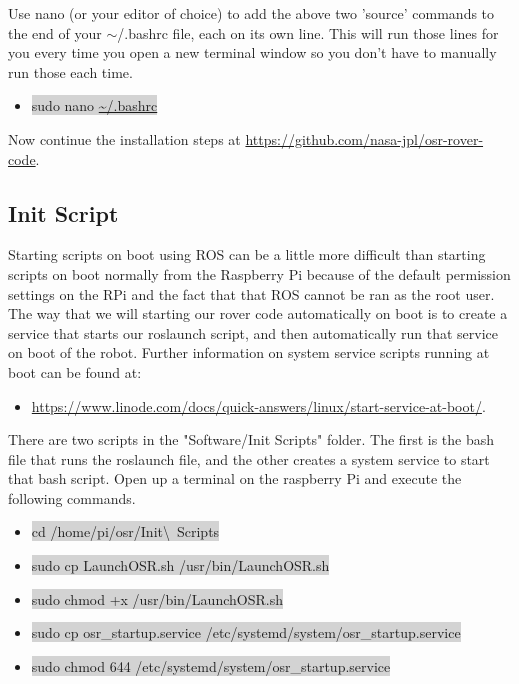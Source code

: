\documentclass{article}
\begin{document}
\noindent Use nano (or your editor of choice) to add the above two 'source' commands to the end of your $\sim$/.bashrc file, each on its own line. This will run those lines for you every time you open a new terminal window so you don't have to manually run those each time.
\begin{itemize}
	\item[] \colorbox{lightgray}{sudo nano \url{~/.bashrc}}
\end{itemize}

Now continue the installation steps at \href{https://github.com/nasa-jpl/osr-rover-code}{https://github.com/nasa-jpl/osr-rover-code}.

\bigskip

\subsection{Init Script}

Starting scripts on boot using ROS can be a little more difficult than starting scripts on boot normally from the Raspberry Pi because of the default permission settings on the RPi and the fact that that ROS cannot be ran as the root user. The way that we will starting our rover code automatically on boot is to create a service that starts our roslaunch script, and then automatically run that service on boot of the robot. Further information on system service scripts running at boot can be found at: 

\begin{itemize}
	\item \href{https://www.linode.com/docs/quick-answers/linux/start-service-at-boot/}{https://www.linode.com/docs/quick-answers/linux/start-service-at-boot/}. 
\end{itemize}

There are two scripts in the "Software/Init Scripts" folder. The first is the bash file that runs the roslaunch file, and the other creates a system service to start that bash script. Open up a terminal on the raspberry Pi and execute the following commands.

\begin{itemize}
	\item[] \colorbox{lightgray}{cd /home/pi/osr/Init\textbackslash\ Scripts}
	\item[] \colorbox{lightgray}{sudo cp LaunchOSR.sh /usr/bin/LaunchOSR.sh}
	\item[] \colorbox{lightgray}{sudo chmod +x /usr/bin/LaunchOSR.sh}
	\item[] \colorbox{lightgray}{sudo cp osr\_startup.service /etc/systemd/system/osr\_startup.service}
	\item[] \colorbox{lightgray}{sudo chmod 644 /etc/systemd/system/osr\_startup.service}
\end{itemize}
\end{document}
